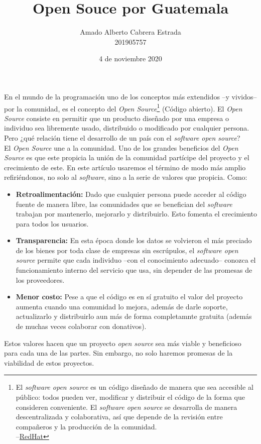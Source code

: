 \documentclass{article}
\title{Open Souce por Guatemala}
\author{Amado Alberto Cabrera Estrada\\
201905757}
\date{4 de noviembre 2020}
\begin{document}
\maketitle

En el mundo de la programación uno de los conceptos más extendidos –y vividos– por la comunidad, es el concepto del \textit{Open Source}\footnote{ El \textit{software open source} es un código diseñado de manera que sea accesible al público: todos pueden ver, modificar y distribuir el código de la forma que consideren conveniente. El \textit{software open source} se desarrolla de manera descentralizada y colaborativa, así que depende de la revisión entre compañeros y la producción de la comunidad.\\ –\href{https://www.redhat.com/es/topics/open-source/what-is-open-source}{RedHat}} (Código abierto). El \textit{Open Source} consiste en permitir que un producto diseñado por una empresa o individuo sea libremente usado, distribuido o modificado por cualquier persona. Pero ¿qué relación tiene el desarrollo de un país con el \textit{software open source}?\\

El \textit{Open Source} une a la comunidad. Uno de los grandes beneficios del \textit{Open Source} es que este propicia la unión de la comunidad partícipe del proyecto y el crecimiento de este. En este artículo usaremos el término de modo más amplio refiriéndonos, no solo al \textit{software}, sino a la serie de valores que propicia. Como:
\begin{itemize}
    \item \textbf{Retroalimentación:}
    Dado que cualquier persona puede acceder al código fuente de manera libre, las comunidades que se benefician del \textit{software} trabajan por mantenerlo, mejorarlo y distribuirlo. Esto fomenta el crecimiento para todos los usuarios.
    
    \item \textbf{Transparencia:}
    En esta época donde los datos se volvieron el más preciado de los bienes por toda clase de empresas sin escrúpulos, el \textit{software open source} permite que cada individuo –con el conocimiento adecuado– conozca el funcionamiento interno del servicio que usa, sin depender de las promesas de los proveedores.
    
    \item \textbf{Menor costo:}
    Pese a que el código es en sí gratuito el valor del proyecto aumenta cuando una comunidad lo mejora, además de darle soporte, actualizarlo y distribuirlo aun más de forma completamnte gratuita (además de muchas veces colaborar con donativos).
\end{itemize}
Estos valores hacen que un proyecto \textit{open source} sea más viable y beneficioso para cada una de las partes. Sin embargo, no solo haremos promesas de la viabilidad de estos proyectos.\\
\end{document}
